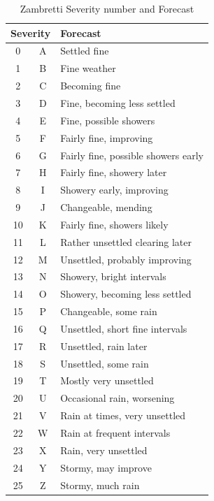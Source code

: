 \begin{table}[ht]
    \caption[Zambretti Severity Number and it's associated Forecast]{Zambretti Severity number and Forecast}
    \begin{tabular}{c c l}
        \toprule
        \multicolumn{2}{c}{Severity} & Forecast \\
        \midrule
        0 & A & Settled fine \\
        1 & B & Fine weather \\
        2 & C & Becoming fine \\
        3 & D & Fine, becoming less settled \\
        4 & E & Fine, possible showers \\
        5 & F & Fairly fine, improving \\
        6 & G & Fairly fine, possible showers early \\
        7 & H & Fairly fine, showery later \\
        8 & I & Showery early, improving \\
        9 & J & Changeable, mending \\
        10 & K & Fairly fine, showers likely \\
        11 & L & Rather unsettled clearing later \\
        12 & M & Unsettled, probably improving \\
        13 & N & Showery, bright intervals \\
        14 & O & Showery, becoming less settled \\
        15 & P & Changeable, some rain \\
        16 & Q & Unsettled, short fine intervals \\
        17 & R & Unsettled, rain later \\
        18 & S & Unsettled, some rain \\
        19 & T & Mostly very unsettled \\
        20 & U & Occasional rain, worsening \\
        21 & V & Rain at times, very unsettled \\
        22 & W & Rain at frequent intervals \\
        23 & X & Rain, very unsettled \\
        24 & Y & Stormy, may improve \\
        25 & Z & Stormy, much rain \\
        \bottomrule
    \end{tabular}
\end{table}

